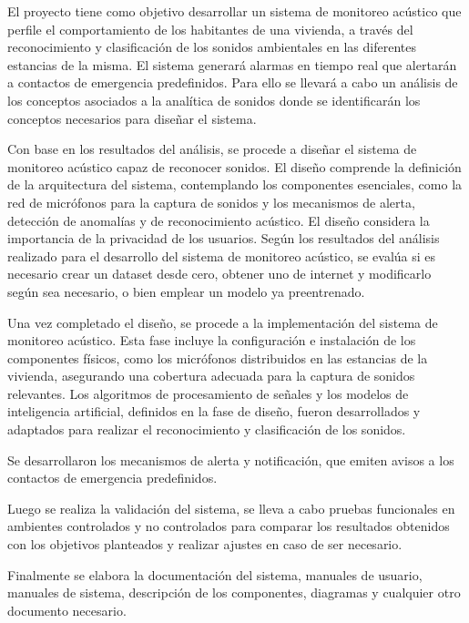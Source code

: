 
El proyecto tiene como objetivo desarrollar un sistema de monitoreo acústico que perfile el comportamiento de los habitantes de una vivienda, a través del reconocimiento y clasificación de los sonidos ambientales en las diferentes estancias de la misma. El sistema generará alarmas en tiempo real que alertarán a contactos de emergencia predefinidos. Para ello se llevará a cabo un análisis de los conceptos asociados a la analítica de sonidos donde se identificarán los conceptos necesarios para diseñar el sistema.

Con base en los resultados del análisis, se procede a diseñar el sistema de monitoreo acústico capaz de reconocer sonidos. El diseño comprende la definición de la arquitectura del sistema, contemplando los componentes esenciales, como la red de micrófonos para la captura de sonidos y los mecanismos de alerta, detección de anomalías y de reconocimiento acústico. El diseño considera la importancia de la privacidad de los usuarios. Según los resultados del análisis realizado para el desarrollo del sistema de monitoreo acústico, se evalúa si es necesario crear un dataset desde cero, obtener uno de internet y modificarlo según sea necesario, o bien emplear un modelo ya preentrenado.

Una vez completado el diseño, se procede a la implementación del sistema de monitoreo acústico. Esta fase incluye la configuración e instalación de los componentes físicos, como los micrófonos distribuidos en las estancias de la vivienda, asegurando una cobertura adecuada para la captura de sonidos relevantes. Los algoritmos de procesamiento de señales y los modelos de inteligencia artificial, definidos en la fase de diseño, fueron desarrollados y adaptados para realizar el reconocimiento y clasificación de los sonidos.

Se desarrollaron los mecanismos de alerta y notificación, que emiten avisos a los contactos de emergencia predefinidos.

Luego se realiza la validación del sistema, se lleva a cabo pruebas funcionales en ambientes controlados y no controlados para comparar los resultados obtenidos con los objetivos planteados y realizar ajustes en caso de ser necesario.

Finalmente se elabora la documentación del sistema, manuales de usuario, manuales de sistema, descripción de los componentes, diagramas y cualquier otro documento necesario.
